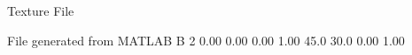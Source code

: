 Texture File

File generated from MATLAB
B 2
   0.00   0.00   0.00  1.00
   45.0   30.0   0.00  1.00
